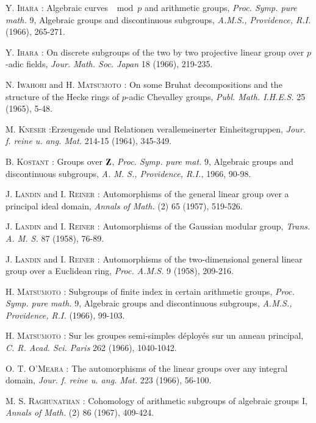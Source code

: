 \begin{thebibliography}{99}
 \textsc{Y. Ihara :} Algebraic curves $\mod p$ and arithmetic groups, {\em Proc. Symp. pure math.} 9, Algebraic groups and discontinuous subgroups, {\em A.M.S., Providence, R.I.} (1966), 265-271.

 \textsc{Y. Ihara :} On discrete subgroups of the two by two projective linear group over $p$-adic fields, {\em Jour. Math. Soc. Japan} 18 (1966), 219-235.

 \textsc{N. Iwahori} and \textsc{H. Matsumoto :} On some Bruhat decompositions and the structure of the Hecke rings of $p$-adic Chevalley groups, {\em Publ. Math. I.H.E.S.} 25 (1965), 5-48.

 \textsc{M. Kneser :}\pageoriginale Erzeugende und Relationen verallemeinerter Einheitsgruppen, {\em Jour. f. reine u. ang. Mat.} 214-15 (1964), 345-349.

 \textsc{B. Kostant :} Groups over $\mathbf{Z}$, {\em Proc. Symp. pure mat.} 9, Algebraic groups and discontinuous subgroups, {\em A. M. S., Providence, R.I.,} 1966, 90-98.

 \textsc{J. Landin} and \textsc{I. Reiner :} Automorphisms of the general linear group over a principal ideal domain, {\em Annals of Math.} (2) 65 (1957), 519-526.

 \textsc{J. Landin} and \textsc{I. Reiner :} Automorphisms of the Gaussian modular group, {\em Trans. A. M. S.} 87 (1958), 76-89.

 \textsc{J. Landin} and \textsc{I. Reiner :} Automorphisms of the two-dimensional general linear group over a Euclidean ring, {\em Proc. A.M.S.} 9 (1958), 209-216.

 \textsc{H. Matsumoto :} Subgroups of finite index in certain arithmetic groups, {\em Proc. Symp. pure math.} 9, Algebraic groups and discontinuous subgroups, {\em A.M.S., Providence, R.I.} (1966), 99-103.

 \textsc{H. Matsumoto :} Sur les groupes semi-simples d\'eploy\'es sur un anneau principal, {\em C. R. Acad. Sci. Paris} 262 (1966), 1040-1042.

 \textsc{O. T. O'Meara :} The automorphisms of the linear groups over any integral domain, {\em Jour. f. reine u. ang. Mat.} 223 (1966), 56-100.

 \textsc{M. S. Raghunathan :} Cohomology of arithmetic subgroups of algebraic groups I, {\em Annals of Math.} (2) 86 (1967), 409-424.


\end{thebibliography}
